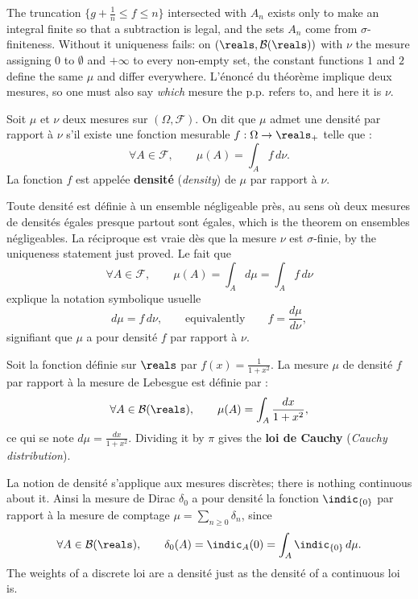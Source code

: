 \begin{remark}
  The truncation $\{g + \frac{1}{n} \leq f \leq n\}$ intersected with $A_{n}$ exists
  only to make an integral finite so that a subtraction is legal, and the sets
  $A_{n}$ come from $\sigma$-finiteness. Without it uniqueness fails: on
  $(\reals,\mathcal{B}(\reals))$ with $\nu$ the mesure assigning $0$ to $\emptyset$
  and $+\infty$ to every non-empty set, the constant functions $1$ and $2$ define the
  same $\mu$ and differ everywhere. L'énoncé du théorème implique deux mesures, so
  one must also say \emph{which} mesure the p.p. refers to, and here it is $\nu$.
\end{remark}

\begin{definition}
  Soit $\mu$ et $\nu$ deux mesures sur $(\Omega,\mathcal{F})$. On dit que $\mu$
  admet une densité par rapport à $\nu$ s'il existe une fonction mesurable $f :
  \Omega \to \reals_{+}$ telle que :
  \[
    \forall A \in \mathcal{F}, \qquad \mu(A) = \int_{A} f \, d\nu .
  \]
  La fonction $f$ est appelée \textbf{densité} (\textit{density}) de $\mu$ par
  rapport à $\nu$.
\end{definition}

Toute densité est définie à un ensemble négligeable près, au sens où deux mesures de
densités égales presque partout sont égales, which is the theorem on ensembles
négligeables. La réciproque est vraie dès que la mesure $\nu$ est $\sigma$-finie, by
the uniqueness statement just proved. Le fait que
\[
  \forall A \in \mathcal{F}, \qquad \mu(A) = \int_{A} d\mu = \int_{A} f \, d\nu
\]
explique la notation symbolique usuelle
\[
  d\mu = f \, d\nu ,
  \qquad \text{equivalently} \qquad
  f = \frac{d\mu}{d\nu} ,
\]
signifiant que $\mu$ a pour densité $f$ par rapport à $\nu$.

\begin{example}
  Soit la fonction définie sur $\reals$ par $f(x) = \frac{1}{1+x^{2}}$. La mesure
  $\mu$ de densité $f$ par rapport à la mesure de Lebesgue est définie par :
  \[
    \forall A \in \mathcal{B}(\reals), \qquad
    \mu(A) = \int_{A} \frac{dx}{1+x^{2}} ,
  \]
  ce qui se note $d\mu = \frac{dx}{1+x^{2}}$. Dividing it by $\pi$ gives the
  \textbf{loi de Cauchy} (\textit{Cauchy distribution}).
\end{example}

\begin{remark}
  La notion de densité s'applique aux mesures discrètes; there is nothing continuous
  about it. Ainsi la mesure de Dirac $\delta_{0}$ a pour densité la fonction
  $\indic_{\{0\}}$ par rapport à la mesure de comptage $\mu = \sum_{n \geq 0}
  \delta_{n}$, since
  \[
    \forall A \in \mathcal{B}(\reals), \qquad
    \delta_{0}(A) = \indic_{A}(0) = \int_{A} \indic_{\{0\}} \, d\mu .
  \]
  The weights of a discrete loi are a densité just as the densité of a continuous
  loi is.
\end{remark}

